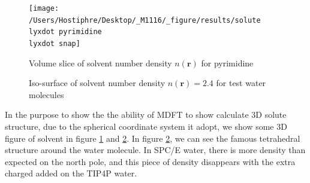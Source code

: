 \begin{figure}
\begin{centering}
\texttt{[image: /Users/Hostiphre/Desktop/\_M1116/\_figure/results/solute\\lyxdot pyrimidine\\lyxdot snap]}
\par\end{centering}
\caption{Volume slice of solvent number density $n(\mathbf{r})$ for pyrimidine\label{fig:Volume-slice-of}}
\end{figure}

\begin{figure}

\caption{Iso-surface of solvent number density $n(\mathbf{r})=2.4$ for test
water molecules\label{fig:Iso-surface-of-solvent}}
\end{figure}

In the purpose to show the the ability of \acs{MDFT} to show calculate
3D solute structure, due to the spherical coordinate system it adopt,
we show some 3D figure of solvent in figure \ref{fig:Volume-slice-of}
and \ref{fig:Iso-surface-of-solvent}. In figure \ref{fig:Iso-surface-of-solvent},
we can see the famous tetrahedral structure around the water molecule.
In SPC/E water, there is more density than expected on the north pole,
and this piece of density disappears with the extra charged added
on the TIP4P water.\newpage{}

$ $
